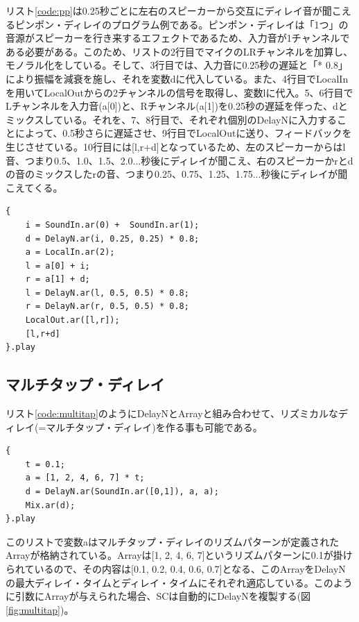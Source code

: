 \documentclass{jsarticle}
\begin{document}
リスト\ref{code:pp}は0.25秒ごとに左右のスピーカーから交互にディレイ音が聞こえるピンポン・ディレイのプログラム例である。ピンポン・ディレイは「1つ」の音源がスピーカーを行き来するエフェクトであるため、入力音が1チャンネルである必要がある。このため、リストの2行目でマイクのLRチャンネルを加算し、モノラル化をしている。そして、3行目では、入力音に0.25秒の遅延と「* 0.8」により振幅を減衰を施し、それを変数dに代入している。また、4行目でLocalInを用いてLocalOutからの2チャンネルの信号を取得し、変数lに代入。5、6行目でLチャンネルを入力音(a[0])と、Rチャンネル(a[1])を0.25秒の遅延を伴った、dとミックスしている。それを、7、8行目で、それぞれ個別のDelayNに入力することによって、0.5秒さらに遅延させ、9行目でLocalOutに送り、フィードバックを生じさせている。10行目には[l,r+d]となっているため、左のスピーカーからはl音、つまり0.5、1.0、1.5、2.0...秒後にディレイが聞こえ、右のスピーカーかrとdの音のミックスしたrの音、つまり0.25、0.75、1.25、1.75...秒後にディレイが聞こえてくる。

\begin{lstlisting}[caption=ピンポン・ディレイ, label=code:pp]
{
	i = SoundIn.ar(0) +  SoundIn.ar(1);
	d = DelayN.ar(i, 0.25, 0.25) * 0.8;
	a = LocalIn.ar(2);
	l = a[0] + i;
	r = a[1] + d;
	l = DelayN.ar(l, 0.5, 0.5) * 0.8; 
	r = DelayN.ar(r, 0.5, 0.5) * 0.8;
	LocalOut.ar([l,r]);
	[l,r+d]
}.play
\end{lstlisting}

\subsection{マルチタップ・ディレイ}
リスト\ref{code:multitap}のようにDelayNとArrayと組み合わせて、リズミカルなディレイ(=マルチタップ・ディレイ)を作る事も可能である。

\begin{lstlisting}[caption=マルチタップ・ディレイ, label=code:multitap]
{
	t = 0.1;
	a = [1, 2, 4, 6, 7] * t;
	d = DelayN.ar(SoundIn.ar([0,1]), a, a);
	Mix.ar(d);
}.play
\end{lstlisting}

このリストで変数aはマルチタップ・ディレイのリズムパターンが定義されたArrayが格納されている。Arrayは[1, 2, 4, 6, 7]というリズムパターンに0.1が掛けられているので、その内容は[0.1, 0.2, 0.4, 0.6, 0.7]となる、このArrayをDelayNの最大ディレイ・タイムとディレイ・タイムにそれぞれ適応している。このように引数にArrayが与えられた場合、SCは自動的にDelayNを複製する(図\ref{fig:multitap})。
\end{document}
